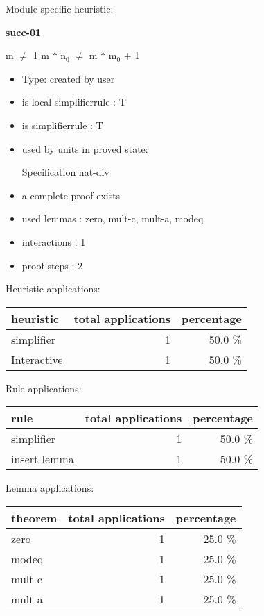\documentclass[a4paper]{article}
\begin{document}
Module specific heuristic:

\pagebreak

{\LARGE\bf succ-01}\label{lemma-succ-01}

\medskip

 \Fol m $\neq$ 1 \Imp m $*$ $\mbox{n}_{0}$ $\neq$ m $*$ $\mbox{m}_{0}$ + 1

\begin{itemize}

\item Type: created by user

\item is local simplifierrule : T
\item is simplifierrule : T
\item used by units in proved state:

Specification nat-div
\item       a complete proof exists
\item       used lemmas  : zero, mult-c, mult-a, modeq
\item       interactions : 1
\item       proof steps  : 2
\end{itemize}

\medskip


Heuristic applications:

\begin{supertabular}{l|r|r}
heuristic	& total applications & percentage \\ \hline
simplifier & 1 & 50.0 \% \\
Interactive & 1 & 50.0 \% \\

\end{supertabular}

Rule applications:

\begin{supertabular}{l|r|r}
rule	        & total applications & percentage \\ \hline
simplifier & 1 & 50.0 \% \\
insert lemma & 1 & 50.0 \% \\

\end{supertabular}

Lemma applications:

\begin{supertabular}{l|r|r}
theorem	        & total applications & percentage \\ \hline
zero & 1 & 25.0 \% \\
modeq & 1 & 25.0 \% \\
mult-c & 1 & 25.0 \% \\
mult-a & 1 & 25.0 \% \\

\end{supertabular}
\end{document}
